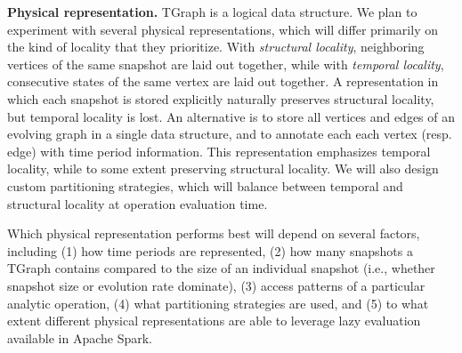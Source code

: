 \documentclass[11pt]{article}
\newcommand*{\tg}{TGraph\xspace}
\begin{document}
{\bf Physical representation.}  \tg is a logical data structure.  We
plan to experiment with several physical representations, which will
differ primarily on the kind of locality that they prioritize.  With
{\em structural locality}, neighboring vertices of the same snapshot
are laid out together, while with {\em temporal locality}, consecutive
states of the same vertex are laid out together.  A representation in
which each snapshot is stored explicitly naturally preserves
structural locality, but temporal locality is lost.  An alternative is
to store all vertices and edges of an evolving graph in a single data
structure, and to annotate each each vertex (resp. edge) with time
period information.  This representation emphasizes temporal locality,
while to some extent preserving structural locality.  We will also
design custom partitioning strategies, which will balance between
temporal and structural locality at operation evaluation time.

Which physical representation performs best will depend on several
factors, including (1) how time periods are represented, (2) how many
snapshots a \tg contains compared to the size of an individual
snapshot (i.e., whether snapshot size or evolution rate dominate), (3)
access patterns of a particular analytic operation, (4) what
partitioning strategies are used, and (5) to what extent different
physical representations are able to leverage lazy evaluation
available in Apache Spark.
\end{document}
